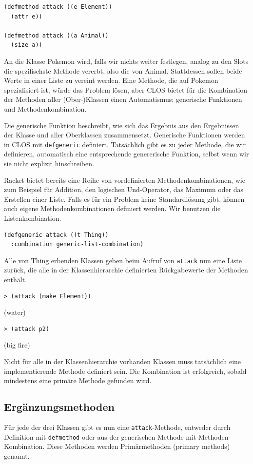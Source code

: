 \begin{lstlisting}
(defmethod attack ((e Element))
  (attr e))

(defmethod attack ((a Animal))
  (size a))
\end{lstlisting}

An die Klasse Pokemon wird, falls wir nichts weiter festlegen, analog zu den Slots die spezifischste Methode vererbt, also die von Animal. Stattdessen sollen beide Werte in einer Liste zu vereint werden. Eine Methode, die auf Pokemon spezialisiert ist, würde das Problem lösen, aber CLOS bietet für die Kombination der Methoden aller (Ober-)Klassen einen Automatismus: generische Funktionen und Methodenkombination. 

Die generische Funktion beschreibt, wie sich das Ergebnis aus den Ergebnissen der Klasse und aller Oberklassen zusammensetzt. Generische Funktionen werden in CLOS mit \texttt{defgeneric} definiert. Tatsächlich gibt es zu jeder Methode, die wir definieren, automatisch eine entsprechende genererische Funktion, selbst wenn wir sie nicht explizit hinschreiben. 

Racket bietet bereits eine Reihe von vordefinierten Methodenkombinationen, wie zum Beispiel für Addition, den logischen Und-Operator, das Maximum oder das Erstellen einer Liste. Falls es für ein Problem keine Standardlösung gibt, können auch eigene Methodenkombinationen definiert werden. Wir benutzen die Listenkombination.

\begin{lstlisting}
(defgeneric attack ((t Thing))
  :combination generic-list-combination)
\end{lstlisting}

Alle von Thing erbenden Klassen geben beim Aufruf von \texttt{attack} nun eine Liste zurück, die alle in der Klassenhierarchie definierten Rückgabewerte der Methoden enthält.

\begin{lstlisting}
> (attack (make Element))
\end{lstlisting}
{\routput (water)}

\begin{lstlisting}
> (attack p2)
\end{lstlisting}
{\routput (big fire)}

Nicht für alle in der Klassenhierarchie vorhanden Klassen muss tatsächlich eine implementierende Methode definiert sein. Die Kombination ist erfolgreich, sobald mindestens eine primäre Methode gefunden wird.

\subsection{Ergänzungsmethoden}
\label{ergmeth}
Für jede der drei Klassen gibt es nun eine \texttt{attack}-Methode, entweder durch Definition mit  \texttt{defmethod} oder aus der generischen Methode mit Methoden-Kombination. Diese Methoden werden Primärmethoden (primary methods) genannt.

